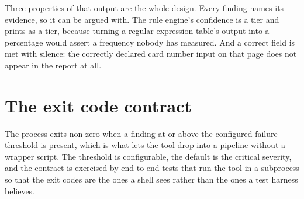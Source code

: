 Three properties of that output are the whole design. Every finding names its
evidence, so it can be argued with. The rule engine's confidence is a tier and
prints as a tier, because turning a regular expression table's output into a
percentage would assert a frequency nobody has measured. And a correct field is
met with silence: the correctly declared card number input on that page does not
appear in the report at all.

\section{The exit code contract}

The process exits non zero when a finding at or above the configured failure
threshold is present, which is what lets the tool drop into a pipeline without a
wrapper script. The threshold is configurable, the default is the critical
severity, and the contract is exercised by end to end tests that run the tool in
a subprocess so that the exit codes are the ones a shell sees rather than the
ones a test harness believes.
